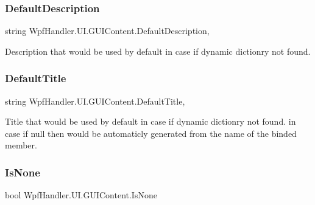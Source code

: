\subsubsection{\texorpdfstring{Default\+Description}{DefaultDescription}}
{\footnotesize\ttfamily string Wpf\+Handler.\+U\+I.\+G\+U\+I\+Content.\+Default\+Description\hspace{0.3cm}{\ttfamily [get]}, {\ttfamily [set]}}



Description that would be used by default in case if dynamic dictionry not found. 

\mbox{\label{class_wpf_handler_1_1_u_i_1_1_g_u_i_content_afa422133cdb4b7e81ab4041e3bcb93ca}} 
\subsubsection{\texorpdfstring{Default\+Title}{DefaultTitle}}
{\footnotesize\ttfamily string Wpf\+Handler.\+U\+I.\+G\+U\+I\+Content.\+Default\+Title\hspace{0.3cm}{\ttfamily [get]}, {\ttfamily [set]}}



Title that would be used by default in case if dynamic dictionry not found. in case if null then would be automaticly generated from the name of the binded member. 

\mbox{\label{class_wpf_handler_1_1_u_i_1_1_g_u_i_content_ab8044a6651911a3b52f47b4cc6c485cd}} 
\subsubsection{\texorpdfstring{Is\+None}{IsNone}}
{\footnotesize\ttfamily bool Wpf\+Handler.\+U\+I.\+G\+U\+I\+Content.\+Is\+None\hspace{0.3cm}{\ttfamily [get]}}



